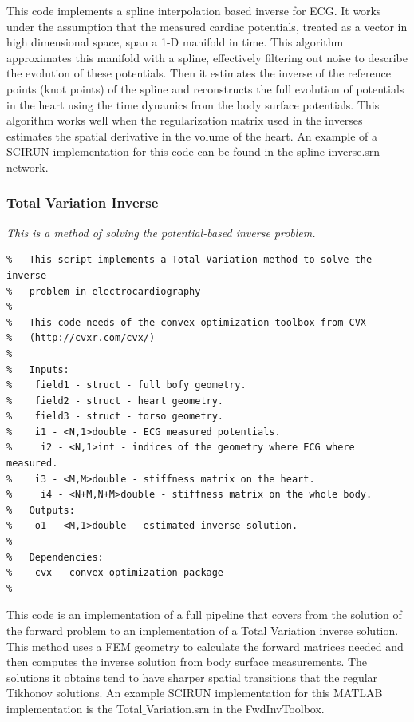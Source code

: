 \documentclass[fleqn,11pt,openany]{book}
\begin{document}
This code implements a spline interpolation based inverse for ECG.
It works under the assumption that the measured cardiac potentials, treated as a vector in high dimensional space, span a 1-D manifold in time.
This algorithm approximates this manifold with a spline, effectively filtering out noise to describe the evolution of these potentials.
Then it estimates the inverse of the reference points (knot points) of the spline and reconstructs the full evolution of potentials in the heart using the time dynamics from the body surface potentials.
This algorithm works well when the regularization matrix used in the inverses estimates the spatial derivative in the volume of the heart.
An example of a SCIRUN implementation for this code can be found in the spline$\_$inverse.srn network. 

\subsubsection{Total Variation Inverse}

\vspace{5pt}\textit{This is a method of solving the potential-based inverse problem.}\vspace{5pt}
\begin{verbatim}
%	This script implements a Total Variation method to solve the inverse
%	problem in electrocardiography 
%
%	This code needs of the convex optimization toolbox from CVX
%	(http://cvxr.com/cvx/)
%
%	Inputs:
%    field1 - struct - full bofy geometry.
%    field2 - struct - heart geometry.
%    field3 - struct - torso geometry.
%    i1 - <N,1>double - ECG measured potentials.
%     i2 - <N,1>int - indices of the geometry where ECG where measured.
%    i3 - <M,M>double - stiffness matrix on the heart.
%     i4 - <N+M,N+M>double - stiffness matrix on the whole body.
%	Outputs:
%    o1 - <M,1>double - estimated inverse solution.
%
%	Dependencies:
%    cvx - convex optimization package
%
\end{verbatim}

This code is an implementation of a full pipeline that covers from the solution of the forward problem to an implementation of a Total Variation inverse solution.
This method uses a FEM geometry to calculate the forward matrices needed and then computes the inverse solution from body surface measurements.
The solutions it obtains tend to have sharper spatial transitions that the regular Tikhonov solutions.
An example SCIRUN implementation for this MATLAB implementation is the Total$\_$Variation.srn in the FwdInvToolbox.
\end{document}
